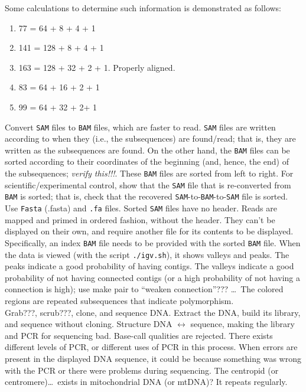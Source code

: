 Some calculations to determine such information is demonstrated as follows: \vspace{-0.3cm}
\begin{enumerate} \itemsep -4pt
\item 77 = 64 + 8 + 4 + 1
\item 141 = 128 + 8 + 4 + 1
\item 163 = 128 + 32 + 2 + 1. Properly aligned.
\item 83 = 64 + 16 + 2 + 1
\item 99 = 64 + 32 + 2+ 1
\end{enumerate}

Convert {\tt SAM} files to {\tt BAM} files, which are faster to read. {\tt SAM} files are written according to when they (i.e., the subsequences) are found/read; that is, they are written as the subsequences are found. On the other hand, the {\tt BAM} files can be sorted according to their coordinates of the beginning (and, hence, the end) of the subsequences; {\it verify this!!!}. These {\tt BAM} files are sorted from left to right. For scientific/experimental control, show that the {\tt SAM} file that is re-converted from {\tt BAM} is sorted; that is, check that the recovered {\tt SAM}-to-{\tt BAM}-to-{\tt SAM} file is sorted. \\

Use {\tt Fasta} (.fasta) and {\tt .fa} files. Sorted {\tt SAM} files have no header. Reads are mapped and primed in ordered fashion, without the header. They can't be displayed on their own, and require another file for its contents to be displayed. Specifically, an index {\tt BAM} file needs to be provided with the sorted {\tt BAM} file. When the data is viewed (with the script {\tt ./igv.sh}), it shows valleys and peaks. The peaks indicate a good probability of having contigs. The valleys indicate a good probability of not having connected contigs (or a high probability of not having a connection is high); use make pair to ``weaken connection''??? \dots\ The colored regions are repeated subsequences that indicate polymorphism. \\

Grab???, scrub???, clone, and sequence DNA. Extract the DNA, build its library, and sequence without cloning. Structure DNA $\longleftrightarrow$ sequence, making the library and PCR for sequencing bad. Base-call qualities are rejected. There exists different levels of PCR, or different uses of PCR in this process. When errors are present in the displayed DNA sequence, it could be because something was wrong with the PCR or there were problems during sequencing. The centropid (or centromere)\dots\ exists in mitochondrial DNA (or mtDNA)? It repeats regularly. \\

